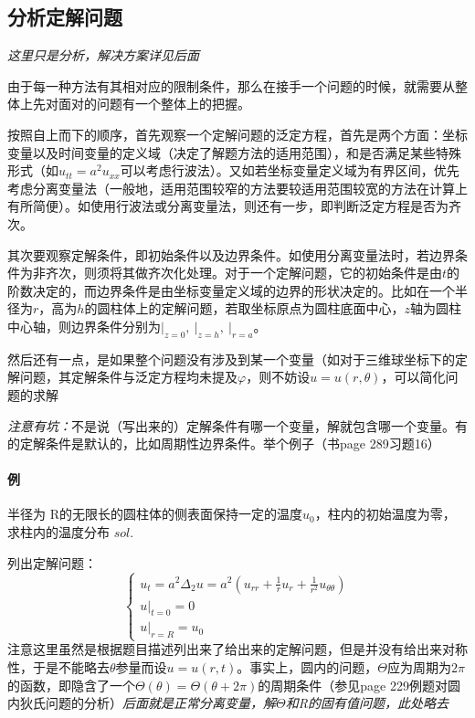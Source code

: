 \documentclass[]{report}
\begin{document}
		\subsection{分析定解问题}
		\textit{这里只是分析，解决方案详见后面}\par
		由于每一种方法有其相对应的限制条件，那么在接手一个问题的时候，就需要从整体上先对面对的问题有一个整体上的把握。\par
		按照自上而下的顺序，首先观察一个定解问题的泛定方程，首先是两个方面：坐标变量以及时间变量的定义域（决定了解题方法的适用范围），和是否满足某些特殊形式（如$u_{tt}=a^2u_{xx}$可以考虑行波法）。又如若坐标变量定义域为有界区间，优先考虑分离变量法（一般地，适用范围较窄的方法要较适用范围较宽的方法在计算上有所简便）。如使用行波法或分离变量法，则还有一步，即判断泛定方程是否为齐次。\par
		其次要观察定解条件，即初始条件以及边界条件。如使用分离变量法时，若边界条件为非齐次，则须将其做齐次化处理。对于一个定解问题，它的初始条件是由$t$的阶数决定的，而边界条件是由坐标变量定义域的边界的形状决定的。比如在一个半径为$r$，高为$h$的圆柱体上的定解问题，若取坐标原点为圆柱底面中心，$z$轴为圆柱中心轴，则边界条件分别为$\vert_{z=0},\ \vert_{z=h},\ \vert_{r=a}$。\par
		然后还有一点，是如果整个问题没有涉及到某一个变量（如对于三维球坐标下的定解问题，其定解条件与泛定方程均未提及$\varphi$，则不妨设$u=u(r,\theta)$，可以简化问题的求解\par
		\textsf{\textit{注意有坑：}}不是说（写出来的）定解条件有哪一个变量，解就包含哪一个变量。有的定解条件是默认的，比如周期性边界条件。举个例子（书page 289习题16）
			\paragraph{例} 半径为 R的无限长的圆柱体的侧表面保持一定的温度$u_0$，柱内的初始温度为零，求柱内的温度分布\newline
			$sol.$\par
			列出定解问题：
			\[\begin{cases}
				u_t=a^2\Delta_2u=a^2(u_{rr}+\frac{1}{r}u_r+\frac{1}{r^2}u_{\theta\theta})\\
				u\vert_{t=0}=0\\
				u\vert_{r=R}=u_0
			\end{cases}\]
			注意这里虽然是根据题目描述列出来了给出来的定解问题，但是并没有给出来对称性，于是不能略去$\theta$参量而设$u=u(r,t)$。事实上，圆内的问题，$\Theta$应为周期为$2\pi$的函数，即隐含了一个$\Theta(\theta)=\Theta(\theta+2\pi)$的周期条件（参见page 229例题对圆内狄氏问题的分析）\textit{后面就是正常分离变量，解$\Theta$和R的固有值问题，此处略去}
\end{document}
